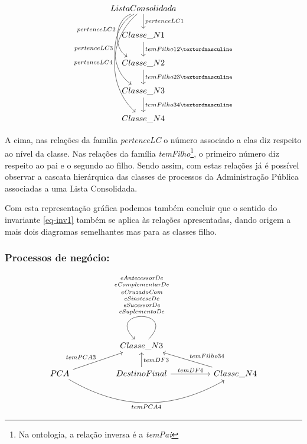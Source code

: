 \documentclass[tikz,runningheads,a4paper]{llncs}
\begin{document}
\begin{equation}
\label{vis_geral}
\begin{tikzcd}
ListaConsolidada \arrow{d}{pertenceLC1} \arrow[swap,bend right=67]{dd}{pertenceLC2} \arrow[swap,bend right=60]{ddd}{pertenceLC3} \arrow[swap,bend right=49]{dddd}{pertenceLC4} \\
Classe\_N1 \arrow{d}{temFilho12º}                                                                                                                                     \\
Classe\_N2 \arrow{d}{temFilho23º}                                                                                                                                     \\
Classe\_N3 \arrow{d}{temFilho34º}                                                                                                                                     \\
Classe\_N4                                                                                                                                                             
\end{tikzcd}
\end{equation}

A cima, nas relações da familia \textit{pertenceLC} o número associado a elas diz respeito ao nível da classe. Nas relações da família \textit{temFilho}\footnote{Na ontologia, a relação inversa é a \textit{temPai}}, o primeiro número diz respeito ao pai e o segundo ao filho. Sendo assim, com estas relações já é possível observar a cascata hierárquica das classes de processos da Administração Pública associadas a uma Lista Consolidada.

Com esta representação gráfica podemos também concluir que o sentido do invariante \ref{eq-inv1} também se aplica às relações apresentadas, dando origem a mais dois diagramas semelhantes mas para as classes filho.

\subsubsection{Processos de negócio:}

\begin{equation}
\label{vis_pn}
\begin{tikzcd}
            &  & Classe\_N3 \arrow[loop,swap]{u}{\textit{\shortstack{eAntecessorDe \\ eComplementarDe \\ eCruzadoCom \\ eSinsteseDe \\ eSucessorDe \\ eSuplementoDe}}}                       &  &                                       \\
PCA \arrow{rru}{temPCA3} \arrow[swap, bend right]{rrrr}{temPCA4} &  & DestinoFinal \arrow[swap]{u}{temDF3} \arrow{rr}{temDF4} &  & Classe\_N4 \arrow[swap]{llu}{temFilho34}
\end{tikzcd}
\end{equation}
\end{document}
